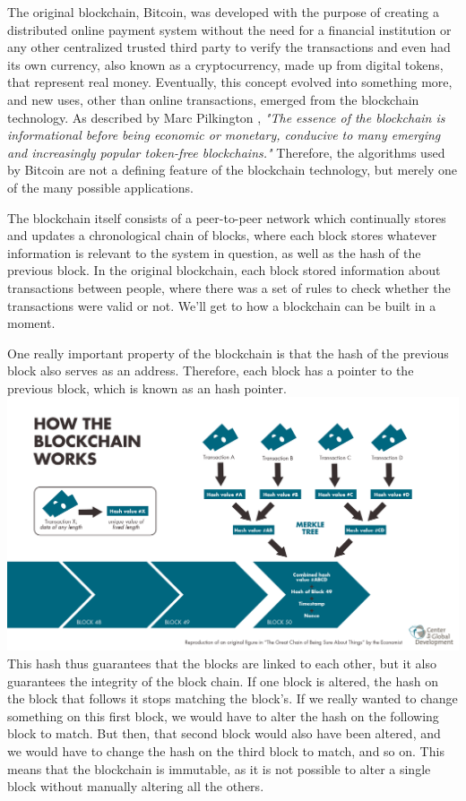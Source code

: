 The original blockchain, Bitcoin, was developed with the purpose of creating a distributed online payment system without the need for a financial institution or any other centralized trusted third party to verify the transactions and even had its own currency, also known as a cryptocurrency, made up from digital tokens, that represent real money. Eventually, this concept evolved into something more, and new uses, other than online transactions, emerged from the blockchain technology. As described by Marc Pilkington \cite{Pilkington2015}, \textit{"The essence of the blockchain is informational before being economic or monetary, conducive to many emerging and increasingly popular token-free blockchains."} Therefore, the algorithms used by Bitcoin are not a defining feature of the blockchain technology, but merely one of the many possible applications.
    
    The blockchain itself consists of a peer-to-peer network which continually stores and updates a chronological chain of blocks, where each block stores whatever information is relevant to the system in question, as well as the hash of the previous block. In the original blockchain, each block stored information about transactions between people, where there was a set of rules to check whether the transactions were valid or not. We'll get to how a blockchain can be built in a moment.
    
    One really important property of the blockchain is that the hash of the previous block also serves as an address. Therefore, each block has a pointer to the previous block, which is known as an hash pointer. %
    \includegraphics[scale=0.35]{media/Blockchain_workflow.png}
    This hash thus guarantees that the blocks are linked to each other, but it also guarantees the integrity of the block chain. If one block is altered, the hash on the block that follows it stops matching the block's. If we really wanted to change something on this  first block, we would have to alter the hash on the following block to match. But then, that second block would also have been altered, and we would have to change the hash on the third block to match, and so on. This means that the blockchain is immutable, as it is not possible to alter a single block without manually altering all the others. 
    
